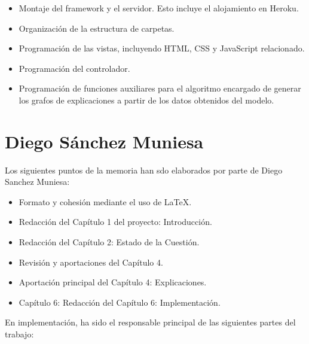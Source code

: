\begin{itemize}
\item Montaje del framework y el servidor. Esto incluye el alojamiento en Heroku.

\item Organización de la estructura de carpetas.

\item Programación de las vistas, incluyendo HTML, CSS y JavaScript relacionado.

\item Programación del controlador.

\item Programación de funciones auxiliares para el algoritmo encargado de generar los grafos de explicaciones a partir de los datos obtenidos del modelo.

\end{itemize}


\section{Diego Sánchez Muniesa}

Los siguientes puntos de la memoria han sdo elaborados por parte de Diego Sanchez Muniesa:

\begin{itemize}
\item Formato y cohesión mediante el uso de LaTeX.

\item Redacción del Capítulo 1 del proyecto: Introducción.

\item Redacción del Capítulo 2: Estado de la Cuestión.

\item Revisión y aportaciones del Capítulo 4.

\item Aportación principal del Capítulo 4: Explicaciones.

\item Capítulo 6: Redacción del Capítulo 6: Implementación.\\

\end{itemize}

En implementación, ha sido el responsable principal de las siguientes partes del trabajo:

